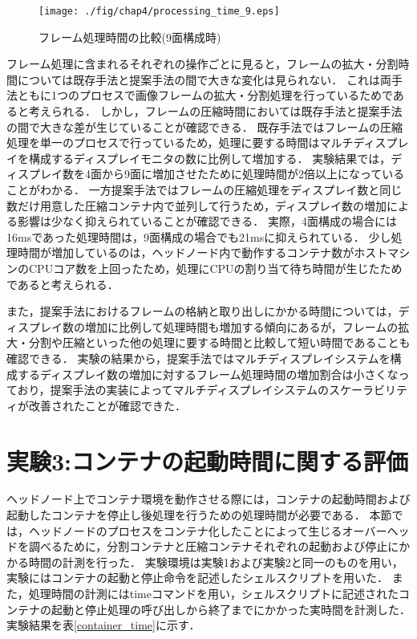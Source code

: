  \begin{figure}[H]
    \hspace*{\fill}
    \texttt{[image: ./fig/chap4/processing\_time\_9.eps]}
    \hspace*{\fill}
    \caption{フレーム処理時間の比較(9面構成時)}
    \label{processing_time_9}
\end{figure}

 フレーム処理に含まれるそれぞれの操作ごとに見ると，フレームの拡大・分割時間については既存手法と提案手法の間で大きな変化は見られない．
 これは両手法ともに1つのプロセスで画像フレームの拡大・分割処理を行っているためであると考えられる．
 しかし，フレームの圧縮時間においては既存手法と提案手法の間で大きな差が生じていることが確認できる．
 既存手法ではフレームの圧縮処理を単一のプロセスで行っているため，処理に要する時間はマルチディスプレイを構成するディスプレイモニタの数に比例して増加する．
 実験結果では，ディスプレイ数を4面から9面に増加させたために処理時間が2倍以上になっていることがわかる．
 一方提案手法ではフレームの圧縮処理をディスプレイ数と同じ数だけ用意した圧縮コンテナ内で並列して行うため，ディスプレイ数の増加による影響は少なく抑えられていることが確認できる．
 実際，4面構成の場合には16msであった処理時間は，9面構成の場合でも21msに抑えられている．
 少し処理時間が増加しているのは，ヘッドノード内で動作するコンテナ数がホストマシンのCPUコア数を上回ったため，処理にCPUの割り当て待ち時間が生じたためであると考えられる．

 また，提案手法におけるフレームの格納と取り出しにかかる時間については，ディスプレイ数の増加に比例して処理時間も増加する傾向にあるが，フレームの拡大・分割や圧縮といった他の処理に要する時間と比較して短い時間であることも確認できる．
 実験の結果から，提案手法ではマルチディスプレイシステムを構成するディスプレイ数の増加に対するフレーム処理時間の増加割合は小さくなっており，提案手法の実装によってマルチディスプレイシステムのスケーラビリティが改善されたことが確認できた．


\section{実験3:コンテナの起動時間に関する評価}
ヘッドノード上でコンテナ環境を動作させる際には，コンテナの起動時間および起動したコンテナを停止し後処理を行うための処理時間が必要である．
本節では，ヘッドノードのプロセスをコンテナ化したことによって生じるオーバーヘッドを調べるために，分割コンテナと圧縮コンテナそれぞれの起動および停止にかかる時間の計測を行った．
実験環境は実験1および実験2と同一のものを用い，実験にはコンテナの起動と停止命令を記述したシェルスクリプトを用いた．
また，処理時間の計測にはtimeコマンドを用い，シェルスクリプトに記述されたコンテナの起動と停止処理の呼び出しから終了までにかかった実時間を計測した．
実験結果を表\ref{container_time}に示す．

